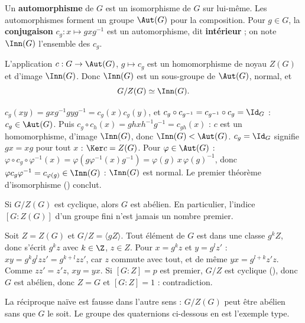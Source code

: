 \begin{definition}[Automorphismes]
Un \textbf{automorphisme} de $G$ est un isomorphisme de $G$ sur lui-même. Les automorphismes forment un groupe $\Aut(G)$ pour la composition. Pour $g\in G$, la \textbf{conjugaison} $c_g:x\mapsto gxg^{-1}$ est un automorphisme, dit \textbf{intérieur} ; on note $\Inn(G)$ l'ensemble des $c_g$.
\end{definition}
\begin{proposition}\label{prop-inn}
L'application $c:G\to\Aut(G)$, $g\mapsto c_g$ est un homomorphisme de noyau $Z(G)$ et d'image $\Inn(G)$. Donc $\Inn(G)$ est un sous-groupe de $\Aut(G)$, normal, et
\[G/Z(G)\simeq\Inn(G).\]
\end{proposition}
\begin{preuve}
$c_g(xy)=gxg^{-1}gyg^{-1}=c_g(x)c_g(y)$, et $c_g\circ c_{g^{-1}}=c_{g^{-1}}\circ c_g=\Id_G$ : $c_g\in\Aut(G)$. Puis $c_g\circ c_h(x)=ghxh^{-1}g^{-1}=c_{gh}(x)$ : $c$ est un homomorphisme, d'image $\Inn(G)$, donc $\Inn(G)<\Aut(G)$. $c_g=\Id_G$ signifie $gx=xg$ pour tout $x$ : $\Ker c=Z(G)$. Pour $\varphi\in\Aut(G)$ : $\varphi\circ c_g\circ\varphi^{-1}(x)=\varphi(g\varphi^{-1}(x)g^{-1})=\varphi(g)\,x\,\varphi(g)^{-1}$, donc $\varphi c_g\varphi^{-1}=c_{\varphi(g)}\in\Inn(G)$ : $\Inn(G)$ est normal. Le premier théorème d'isomorphisme () conclut.
\end{preuve}
\begin{proposition}\label{prop-gz-cyclique}
Si $G/Z(G)$ est cyclique, alors $G$ est abélien. En particulier, l'indice $[G:Z(G)]$ d'un groupe fini n'est jamais un nombre premier.
\end{proposition}
\begin{preuve}
Soit $Z=Z(G)$ et $G/Z=\langle gZ\rangle$. Tout élément de $G$ est dans une classe $g^kZ$, donc s'écrit $g^kz$ avec $k\in\Z$, $z\in Z$. Pour $x=g^kz$ et $y=g^lz'$ : $xy=g^kg^lzz'=g^{k+l}zz'$, car $z$ commute avec tout, et de même $yx=g^{l+k}z'z$. Comme $zz'=z'z$, $xy=yx$. Si $[G:Z]=p$ est premier, $G/Z$ est cyclique (), donc $G$ est abélien, donc $Z=G$ et $[G:Z]=1$ : contradiction.
\end{preuve}
\begin{attention}
La réciproque naïve est fausse dans l'autre sens : $G/Z(G)$ peut être abélien sans que $G$ le soit. Le groupe des quaternions ci-dessous en est l'exemple type.
\end{attention}
